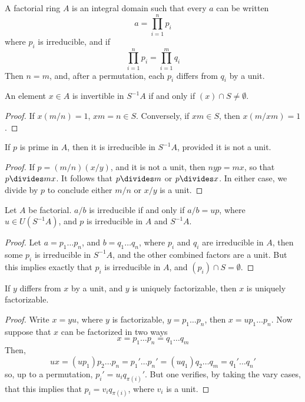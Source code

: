 \begin{definition}
    A factorial ring $A$ is an integral domain such that every $a$ can be written
    \[ a = \prod_{i = 1}^n p_i \]
    where $p_i$ is irreducible, and if
    \[ \prod_{i = 1}^n p_i = \prod_{i = 1}^m q_i \]
    Then $n = m$, and, after a permutation, each $p_i$ differs from $q_i$ by a unit.
\end{definition}

\begin{lemma}
    An element $x \in A$ is invertible in $S^{-1}A$ if and only if $(x) \cap S \neq \emptyset$.
\end{lemma}
\begin{proof}
    If $x (m/n) = 1$, $xm = n \in S$. Conversely, if $xm \in S$, then $x (m/xm) = 1$.
\end{proof}

\begin{lemma}
    If $p$ is prime in $A$, then it is irreducible in $S^{-1}A$, provided it is not a unit.
\end{lemma}
\begin{proof}
    If $p = (m/n)(x/y)$, and it is not a unit, then $nyp = mx$, so that $p \divides mx$. It follows that $p \divides m$ or $p \divides x$. In either case, we divide by $p$ to conclude either $m/n$ or $x/y$ is a unit.
\end{proof}

\begin{lemma}
    Let $A$ be factorial. $a/b$ is irreducible if and only if $a/b = up$, where $u \in U(S^{-1}A)$, and $p$ is irreducible in $A$ and $S^{-1}A$.
\end{lemma}
\begin{proof}
     Let $a = p_1 \dots p_n$, and $b = q_1 \dots q_n$, where $p_i$ and $q_i$ are irreducible in $A$, then some $p_i$ is irreducible in $S^{-1}A$, and the other combined factors are a unit. But this implies exactly that $p_i$ is irreducible in $A$, and $(p_i) \cap S = \emptyset$.
\end{proof}

\begin{lemma}
    If $y$ differs from $x$ by a unit, and $y$ is uniquely factorizable, then $x$ is uniquely factorizable.
\end{lemma}
\begin{proof}
    Write $x = yu$, where $y$ is factorizable, $y = p_1 \dots p_n$, then $x = u p_1 \dots p_n$. Now suppose that $x$ can be factorized in two ways
    \[ x = p_1 \dots p_n = q_1 \dots q_m \]
    Then,
    \[ ux = (up_1) p_2 \dots p_n = p_1' \dots p_n' = (uq_1) q_2 \dots q_m = q_1' \dots q_n' \]
    so, up to a permutation, $p_i' = u_i q_{\pi(i)}'$. But one verifies, by taking the vary cases, that this implies that $p_i = v_i q_{\pi(i)}$, where $v_i$ is a unit.
\end{proof}


